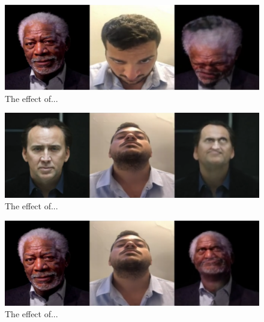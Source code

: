 \documentclass[english,12pt]{article}
\begin{document}
\begin{figure}[htb]
  \begin{centering}
      \includegraphics[scale=0.29]{images/‏‏Amit_tilt1_freeman.PNG}
  \par\end{centering}
  \caption{\label{fig:Amit_tilt1_freeman}The effect of...}
\end{figure}

\begin{figure}[htb]
  \begin{centering}
      \includegraphics[scale=0.29]{images/‏‏Amit_tilt_cage.PNG}
  \par\end{centering}
  \caption{\label{fig:Amit_tilt_cage}The effect of...}
\end{figure}

\begin{figure}[htb]
  \begin{centering}
      \includegraphics[scale=0.29]{images/‏‏Amit_tilt_freeman.PNG}
  \par\end{centering}
  \caption{\label{fig:Amit_tilt_freeman}The effect of...}
\end{figure}
\end{document}
